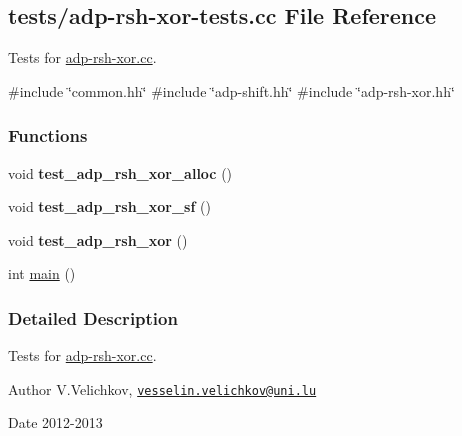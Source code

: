 \hypertarget{adp-rsh-xor-tests_8cc}{\subsection{tests/adp-\/rsh-\/xor-\/tests.cc \-File \-Reference}
\label{adp-rsh-xor-tests_8cc}
}


\-Tests for \hyperlink{adp-rsh-xor_8cc}{adp-\/rsh-\/xor.\-cc}.  


{\ttfamily \#include \char`\"{}common.\-hh\char`\"{}}\*
{\ttfamily \#include \char`\"{}adp-\/shift.\-hh\char`\"{}}\*
{\ttfamily \#include \char`\"{}adp-\/rsh-\/xor.\-hh\char`\"{}}\*
\subsubsection*{\-Functions}
\begin{DoxyCompactItemize}
\item 
\hypertarget{adp-rsh-xor-tests_8cc_a9c52945efc7ed6e08cd730fe994d0b13}{void {\bfseries test\-\_\-adp\-\_\-rsh\-\_\-xor\-\_\-alloc} ()}\label{adp-rsh-xor-tests_8cc_a9c52945efc7ed6e08cd730fe994d0b13}

\item 
\hypertarget{adp-rsh-xor-tests_8cc_ae6434f5790101a23fef785cb4c6c1d01}{void {\bfseries test\-\_\-adp\-\_\-rsh\-\_\-xor\-\_\-sf} ()}\label{adp-rsh-xor-tests_8cc_ae6434f5790101a23fef785cb4c6c1d01}

\item 
\hypertarget{adp-rsh-xor-tests_8cc_ae6ff66ac512579117cccb678087fdb41}{void {\bfseries test\-\_\-adp\-\_\-rsh\-\_\-xor} ()}\label{adp-rsh-xor-tests_8cc_ae6ff66ac512579117cccb678087fdb41}

\item 
int \hyperlink{adp-rsh-xor-tests_8cc_ae66f6b31b5ad750f1fe042a706a4e3d4}{main} ()
\end{DoxyCompactItemize}


\subsubsection{\-Detailed \-Description}
\-Tests for \hyperlink{adp-rsh-xor_8cc}{adp-\/rsh-\/xor.\-cc}. \begin{DoxyAuthor}{\-Author}
\-V.\-Velichkov, \href{mailto:vesselin.velichkov@uni.lu}{\tt vesselin.\-velichkov@uni.\-lu} 
\end{DoxyAuthor}
\begin{DoxyDate}{\-Date}
2012-\/2013 
\end{DoxyDate}


